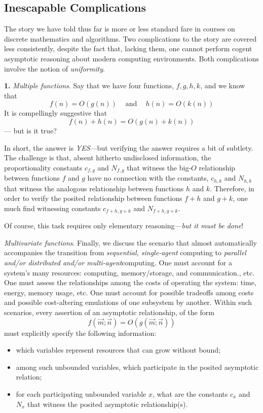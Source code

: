 \subsection{Inescapable Complications}
\label{sec:asymptotic-complication}

The story we have told thus far is more or less standard fare in courses on discrete mathematics and algorithms.  Two complications to the story are covered less consistently, despite the fact that, lacking them, one cannot perform cogent asymptotic reasoning about modern computing
environments.  Both complications involve the notion of {\em uniformity}. 

\medskip

\noindent
{\bf 1.}
{\em Multiple functions}.
Say that we have four functions, $f, g, h, k$, and we know that
\[ f(n) = O(g(n)) \ \ \ \  \mbox{ and } \ \ \ \ h(n) = O(k(n)) \]
It is compellingly suggestive that
\[ f(n) + h(n) = O(g(n) + k(n)) \]
--- but is it true?

\smallskip

In short, the answer is {\em YES}---but verifying the answer requires a bit of subtlety.  The challenge is that, absent hitherto undisclosed information, the proportionality constants $c_{f,g}$ and $N_{f,g}$ that witness the big-$O$ relationship between functions $f$ and $g$ have no connection with the constants, $c_{h,k}$ and $N_{h,k}$ that witness the analogous relationship between functions $h$ and $k$.  Therefore, in order to verify the posited relationship between functions $f + h$ and $g + k$, one much find witnessing constants $c_{f+h, g+k}$ and $N_{f+h,g+k}$.

\smallskip

\noindent
Of course, this task requires only elementary reasoning---{\em but it must be done}!

\medskip

{\em Multivariate functions}.
Finally, we discuss the scenario that almost automatically accompanies the transition from {\em sequential, single-agent} computing to {\em parallel and/or distributed and/or multi-agent}computing.  One must account for a system's many resources: computing, memory/storage, and communication., etc.  One must assess the relationships among the costs of operating the system: time, energy, memory usage, etc.  One must account for possible tradeoffs among costs and possible cost-altering emulations of one subsystem by another. Within such scenarios, every assertion of an asymptotic relationship, of the form
\[ f(\vec{m}; \vec{n}) = O(g(\vec{m}; \vec{n})) \]
must explicitly specify the following information:
\begin{itemize}
\item
which variables represent resources that can grow without bound;
\item
among such unbounded variables, which participate in the posited asymptotic relation;
\item
for each participating unbounded variable $x$, what are the constants $c_x$ and $N_x$ that witness the posited asymptotic relationship(s).
\end{itemize}

